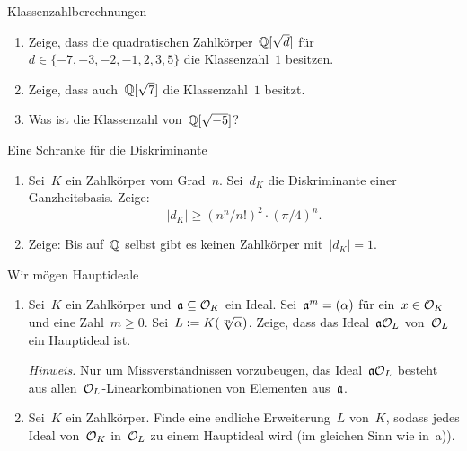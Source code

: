 \documentclass{uebblatt}
\begin{document}

\begin{aufgabe}{Klassenzahlberechnungen}
\begin{enumerate}
\item Zeige, dass die quadratischen Zahlkörper~$\mathbb{Q}[\sqrt{d}]$ für~$d \in \{
-7, -3, -2, -1, 2, 3, 5 \}$ die Klassenzahl~$1$ besitzen.
\item Zeige, dass auch~$\mathbb{Q}[\sqrt{7}]$ die Klassenzahl~$1$ besitzt.
\item Was ist die Klassenzahl von~$\mathbb{Q}[\sqrt{-5}]$?
\end{enumerate}
\end{aufgabe}

\begin{aufgabe}{Eine Schranke für die Diskriminante}
\begin{enumerate}
\item Sei~$K$ ein Zahlkörper vom Grad~$n$. Sei~$d_K$ die Diskriminante einer
Ganzheitsbasis. Zeige:
\[ |d_K| \geq (n^n / n!)^2 \cdot (\pi/4)^n. \]
\item Zeige: Bis auf~$\mathbb{Q}$ selbst gibt es keinen Zahlkörper mit~$|d_K| = 1$.
\end{enumerate}
\end{aufgabe}

\begin{aufgabe}{Wir mögen Hauptideale}
\begin{enumerate}
\item Sei~$K$ ein Zahlkörper und~$\mathfrak{a} \subseteq \mathcal{O}_K$ ein Ideal. Sei~$\mathfrak{a}^m =
(\alpha)$ für ein~$x \in \mathcal{O}_K$ und eine Zahl~$m \geq 0$. Sei~$L \vcentcolon=
K(\sqrt[m]{\alpha})$. Zeige, dass das Ideal~$\mathfrak{a} \mathcal{O}_L$ von~$\mathcal{O}_L$ ein
Hauptideal ist.

{\tiny\emph{Hinweis.} Nur um Missverständnissen vorzubeugen, das
Ideal~$\mathfrak{a}\mathcal{O}_L$ besteht aus allen~$\mathcal{O}_L$-Linearkombinationen von Elementen
aus~$\mathfrak{a}$.\par}
\item Sei~$K$ ein Zahlkörper. Finde eine endliche Erweiterung~$L$ von~$K$,
sodass jedes Ideal von~$\mathcal{O}_K$ in~$\mathcal{O}_L$ zu einem Hauptideal wird (im gleichen
Sinn wie in~a)).
\end{enumerate}
\end{aufgabe}
\end{document}
